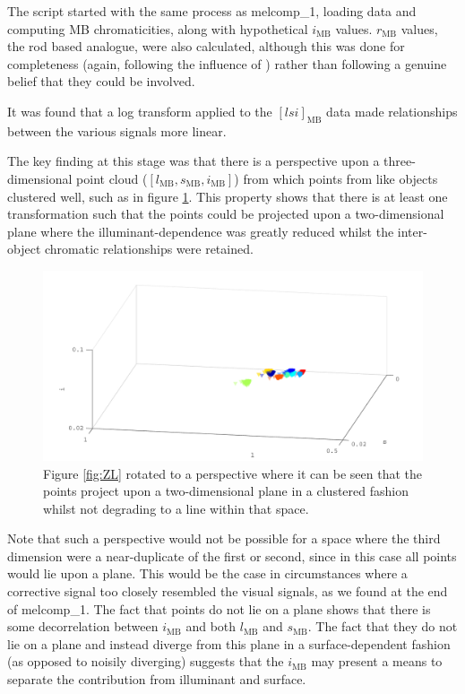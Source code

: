 The script started with the same process as melcomp\_1, loading data and computing \gls{MB} chromaticities, along with hypothetical $i_{\text{MB}}$ values. $r_{\text{MB}}$ values, the rod based analogue, were also calculated, although this was done for completeness (again, following the influence of \cite{barrionuevo_contributions_2014}) rather than following a genuine belief that they could be involved.



It was found that a log transform applied to the $[lsi]_{\text{MB}}$ data made relationships between the various signals more linear.

The key finding at this stage was that there is a perspective upon a three-dimensional point cloud ($[l_{\text{MB}},s_{\text{MB}},i_{\text{MB}}]$) from which points from like objects clustered well, such as in figure \ref{fig:viewpoint}. This property shows that there is at least one transformation such that the points could be projected upon a two-dimensional plane where the illuminant-dependence was greatly reduced whilst the inter-object chromatic relationships were retained. 

\begin{figure}[htbp] %
 \includegraphics[max width=\textwidth]{figs/comp/melcomp_2_caller/viewpoint.pdf}
 \caption{Figure \ref{fig:ZL} rotated to a perspective where it can be seen that the points project upon a two-dimensional plane in a clustered fashion whilst not degrading to a line within that space.}
 \label{fig:viewpoint}
\end{figure} 

Note that such a perspective would not be possible for a space where the third dimension were a near-duplicate of the first or second, since in this case all points would lie upon a plane. This would be the case in circumstances where a corrective signal too closely resembled the visual signals, as we found at the end of melcomp\_1. The fact that points do not lie on a plane shows that there is some decorrelation between $i_{\text{MB}}$ and both $l_{\text{MB}}$ and $s_{\text{MB}}$. The fact that they do not lie on a plane and instead diverge from this plane in a surface-dependent fashion (as opposed to noisily diverging) suggests that the $i_{\text{MB}}$ may present a means to separate the contribution from illuminant and surface. 

